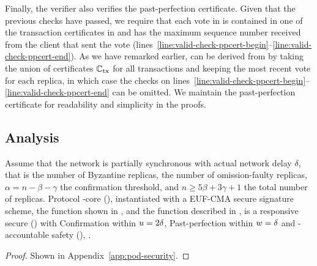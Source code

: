 Finally, the verifier also verifies the past-perfection certificate. Given that the previous checks have passed, we require that each vote in \ppcert is contained in one of the transaction certificates in \alltxcert and has the maximum sequence number received from the client that sent the vote (lines~\ref{line:valid-check-ppcert-begin}--\ref{line:valid-check-ppcert-end}).
As we have remarked earlier, \ppcert can be derived from \alltxcert by taking the union of certificates $\mathbb{C}_\text{tx}$ for all transactions and keeping the most recent vote for each replica, in which case the checks on lines~\ref{line:valid-check-ppcert-begin}--\ref{line:valid-check-ppcert-end} can be omitted. We maintain the past-perfection certificate for readability and simplicity in the proofs.


\subsection{Analysis}

\begin{theorem}\label{thm:pod-security}
    Assume that the network is partially synchronous with actual network delay $\delta$, that \beta is the number of Byzantine replicas, \gamma the number of omission-faulty replicas, $\alpha = n - \beta - \gamma$ the confirmation threshold, and $n \geq 5 \beta + 3 \gamma + 1$ the total number of replicas. Protocol \podtm-core (), instantiated with a EUF-CMA secure signature scheme, the \opValid{} function shown in , and the \identify{} function described in , is a responsive secure \podtm () with Confirmation within $u = 2 \delta$, Past-perfection within $w = \delta$ and  \beta-accountable safety (), \ewnp.
\end{theorem}
\begin{proof}
    Shown in Appendix~\ref{app:pod-security}.
\end{proof}


